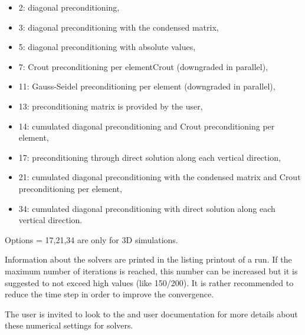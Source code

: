 \begin{itemize}
\begin{itemize}
\item 2:  diagonal preconditioning,

\item 3:  diagonal preconditioning with the condensed matrix,

\item 5:  diagonal preconditioning with absolute values,

\item 7:  Crout preconditioning per elementCrout (downgraded in parallel),

\item 11: Gauss-Seidel preconditioning per element (downgraded in parallel),

\item 13: preconditioning matrix is provided by the user,

\item 14: cumulated diagonal preconditioning and Crout preconditioning per
element,

\item 17:  preconditioning through direct solution along each vertical
direction,

\item 21:  cumulated diagonal preconditioning with the condensed matrix and
Crout preconditioning per element,

\item 34:  cumulated diagonal preconditioning with direct solution along each
vertical direction.
\end{itemize}
Options {\ttfamily = 17,21,34} are only for 3D simulations.
\end{itemize}
Information about the solvers are printed in the listing printout of a
run. If the maximum number of iterations is reached, this number can be increased
but it is suggested to not exceed high values (like 150/200). It is rather
recommended to reduce the time step in order to improve the convergence.

The user is invited to look to the  and  user
documentation for more details about these numerical settings for solvers.
